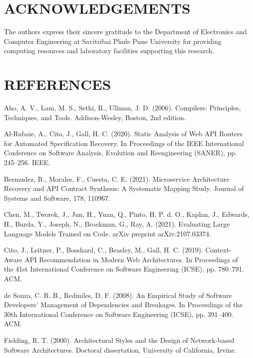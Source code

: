 \documentclass[a4paper,10pt]{article}
\begin{document}
\section*{ACKNOWLEDGEMENTS}
\noindent
The authors express their sincere gratitude to the Department of Electronics and Computer Engineering at Savitribai Phule Pune University for providing computing resources and laboratory facilities supporting this research.

\section*{REFERENCES}
\noindent
\hangindent=0.5cm\fontsize{9pt}{11pt}\selectfont
Aho, A. V., Lam, M. S., Sethi, R., Ullman, J. D. (2006). Compilers: Principles, Techniques, and Tools. Addison-Wesley, Boston, 2nd edition.\par
\hangindent=0.5cm
Al-Rubaie, A., Cito, J., Gall, H. C. (2020). Static Analysis of Web API Routers for Automated Specification Recovery. In Proceedings of the IEEE International Conference on Software Analysis, Evolution and Reengineering (SANER), pp. 245--256. IEEE.\par
\hangindent=0.5cm
Bermudez, R., Morales, F., Cuesta, C. E. (2021). Microservice Architecture Recovery and API Contract Synthesis: A Systematic Mapping Study. Journal of Systems and Software, 178, 110967.\par
\hangindent=0.5cm
Chen, M., Tworek, J., Jun, H., Yuan, Q., Pinto, H. P. d. O., Kaplan, J., Edwards, H., Burda, Y., Joseph, N., Brockman, G., Ray, A. (2021). Evaluating Large Language Models Trained on Code. arXiv preprint arXiv:2107.03374.\par
\hangindent=0.5cm
Cito, J., Leitner, P., Bosshard, C., Beasley, M., Gall, H. C. (2019). Context-Aware API Recommendation in Modern Web Architectures. In Proceedings of the 41st International Conference on Software Engineering (ICSE), pp. 780--791. ACM.\par
\hangindent=0.5cm
de Souza, C. R. B., Redmiles, D. F. (2008). An Empirical Study of Software Developers' Management of Dependencies and Breakages. In Proceedings of the 30th International Conference on Software Engineering (ICSE), pp. 391--400. ACM.\par
\hangindent=0.5cm
Fielding, R. T. (2000). Architectural Styles and the Design of Network-based Software Architectures. Doctoral dissertation, University of California, Irvine.\par
\end{document}
